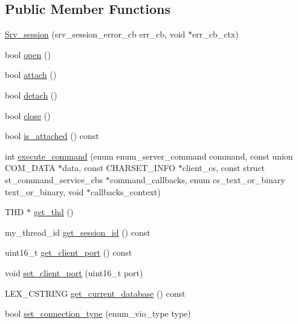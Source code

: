 \subsection*{Public Member Functions}
\begin{DoxyCompactItemize}
\item 
\mbox{\hyperlink{classSrv__session_a3f79b456c9e365806f12ee5aa67bfbcb}{Srv\+\_\+session}} (srv\+\_\+session\+\_\+error\+\_\+cb err\+\_\+cb, void $\ast$err\+\_\+cb\+\_\+ctx)
\item 
bool \mbox{\hyperlink{classSrv__session_a99347e58c5498ce76891ace87456562f}{open}} ()
\item 
bool \mbox{\hyperlink{classSrv__session_a73df8d1a4af78c58ffaacb6097ccf74d}{attach}} ()
\item 
bool \mbox{\hyperlink{classSrv__session_a3ab2665c1d523681147c5f502847a126}{detach}} ()
\item 
bool \mbox{\hyperlink{classSrv__session_a4254885df510bcca1d1cdc88c9366028}{close}} ()
\item 
bool \mbox{\hyperlink{classSrv__session_a53e0d134096447b8f368499bb840201c}{is\+\_\+attached}} () const
\item 
int \mbox{\hyperlink{classSrv__session_a30f0a176fbc3ce50c5f596ab394ab42f}{execute\+\_\+command}} (enum enum\+\_\+server\+\_\+command command, const union C\+O\+M\+\_\+\+D\+A\+TA $\ast$data, const C\+H\+A\+R\+S\+E\+T\+\_\+\+I\+N\+FO $\ast$client\+\_\+cs, const struct st\+\_\+command\+\_\+service\+\_\+cbs $\ast$command\+\_\+callbacks, enum cs\+\_\+text\+\_\+or\+\_\+binary text\+\_\+or\+\_\+binary, void $\ast$callbacks\+\_\+context)
\item 
T\+HD $\ast$ \mbox{\hyperlink{classSrv__session_afeee05328ba7f7be16a12c5cb853945c}{get\+\_\+thd}} ()
\item 
my\+\_\+thread\+\_\+id \mbox{\hyperlink{classSrv__session_a9acafc348256db7c721c5a6f9d41dee2}{get\+\_\+session\+\_\+id}} () const
\item 
uint16\+\_\+t \mbox{\hyperlink{classSrv__session_a878dc80c2ab07372ba9ae8cbafb0caa1}{get\+\_\+client\+\_\+port}} () const
\item 
void \mbox{\hyperlink{classSrv__session_a3d4af0d7cf8b34661a3ec6f839f39f7f}{set\+\_\+client\+\_\+port}} (uint16\+\_\+t port)
\item 
L\+E\+X\+\_\+\+C\+S\+T\+R\+I\+NG \mbox{\hyperlink{classSrv__session_a7da787fab7bb8d045441efa8e2c2aa3c}{get\+\_\+current\+\_\+database}} () const
\item 
bool \mbox{\hyperlink{classSrv__session_a93957a74e9e34a490425cd03de471650}{set\+\_\+connection\+\_\+type}} (enum\+\_\+vio\+\_\+type type)
\end{DoxyCompactItemize}
